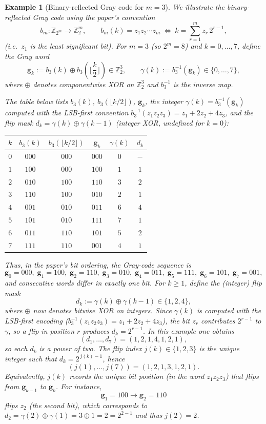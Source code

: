\documentclass{article}
\newtheorem{example}[theorem]{Example}
\numberwithin{equation}{section}
\begin{document}
\begin{example}[Binary-reflected Gray code for $m=3$]\label{ex:graycode_m3}
We illustrate the binary-reflected Gray code using the paper's convention
\[
b_m:\mathbb{Z}_{2^m} \to \mathbb{Z}_2^m,\qquad
b_m(k)=z_1z_2\cdots z_m\ \Longleftrightarrow\ k=\sum_{r=1}^m z_r\,2^{r-1},
\]
(i.e.\ $z_1$ is the least significant bit). For $m=3$ (so $2^m=8$) and $k=0,\dots,7$, define the Gray word
\[
\mathbf{g}_k:= b_3(k)\oplus b_3\!\left(\Big\lfloor\frac{k}{2}\Big\rfloor\right)\in\mathbb{Z}_2^3,
\qquad
\gamma(k):=b_3^{-1}(\mathbf{g}_k)\in\{0,\dots,7\},
\]
where $\oplus$ denotes componentwise XOR on $\mathbb{Z}_2^3$ and $b_3^{-1}$ is the inverse map.

The table below lists $b_3(k)$, $b_3(\lfloor k/2\rfloor)$, $\mathbf{g}_k$,
the integer $\gamma(k)=b_3^{-1}(\mathbf{g}_k)$ computed with the LSB-first convention
$b_3^{-1}(z_1z_2z_3)=z_1+2z_2+4z_3$, and the flip mask $d_k=\gamma(k)\oplus\gamma(k-1)$
(integer XOR, undefined for $k=0$):

\medskip
\begin{center}
\begin{tabular}{c|c|c|c|c|c}
$k$ & $b_3(k)$ & $b_3(\lfloor k/2\rfloor)$ & $\mathbf{g}_k$ & $\gamma(k)$ & $d_k$\\
\hline
$0$ & $000$ & $000$ & $000$ & $0$ & $-$\\
$1$ & $100$ & $000$ & $100$ & $1$ & $1$\\
$2$ & $010$ & $100$ & $110$ & $3$ & $2$\\
$3$ & $110$ & $100$ & $010$ & $2$ & $1$\\
$4$ & $001$ & $010$ & $011$ & $6$ & $4$\\
$5$ & $101$ & $010$ & $111$ & $7$ & $1$\\
$6$ & $011$ & $110$ & $101$ & $5$ & $2$\\
$7$ & $111$ & $110$ & $001$ & $4$ & $1$
\end{tabular}
\end{center}
\medskip

Thus, in the paper's bit ordering, the Gray-code sequence is
\[
\mathbf{g}_0=000,\;
\mathbf{g}_1=100,\;
\mathbf{g}_2=110,\;
\mathbf{g}_3=010,\;
\mathbf{g}_4=011,\;
\mathbf{g}_5=111,\;
\mathbf{g}_6=101,\;
\mathbf{g}_7=001,
\]
and consecutive words differ in exactly one bit. For $k\ge 1$, define the (integer) flip mask
\[
d_k:=\gamma(k)\oplus \gamma(k-1)\in\{1,2,4\},
\]
where $\oplus$ now denotes bitwise XOR on integers.
Since $\gamma(k)$ is computed with the LSB-first encoding ($b_3^{-1}(z_1z_2z_3)=z_1+2z_2+4z_3$),
the bit $z_r$ contributes $2^{r-1}$ to $\gamma$, so a flip in position $r$ produces $d_k=2^{r-1}$.
In this example one obtains
\[
(d_1,\dots,d_7)=(1,2,1,4,1,2,1),
\]
so each $d_k$ is a power of two. The flip index $j(k)\in\{1,2,3\}$ is the unique integer such that
$d_k=2^{\,j(k)-1}$, hence
\[
(j(1),\dots,j(7))=(1,2,1,3,1,2,1).
\]
Equivalently, $j(k)$ records the unique bit position (in the word $z_1z_2z_3$) that flips from $\mathbf{g}_{k-1}$ to $\mathbf{g}_k$.
For instance,
\[
\mathbf{g}_1=100 \longrightarrow \mathbf{g}_2=110
\]
flips $z_2$ (the second bit), which corresponds to $d_2=\gamma(2)\oplus\gamma(1)=3\oplus 1=2=2^{2-1}$
and thus $j(2)=2$.
\end{example}
\end{document}
